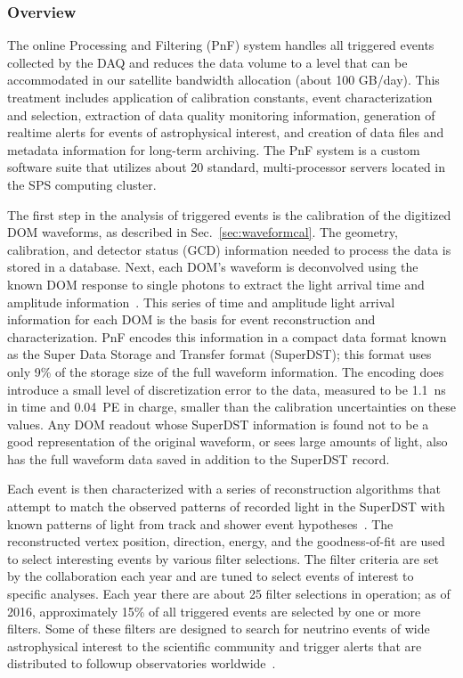\subsubsection{Overview}

The online Processing and Filtering (PnF) system handles
all triggered events collected by the DAQ
and reduces the data volume to a level that can be accommodated in our
satellite bandwidth allocation (about 100 GB/day).  This treatment
includes application of calibration constants, event
characterization and selection, extraction of data quality monitoring
information, generation of realtime alerts for events of astrophysical
interest, and creation of data files and metadata information for long-term
archiving.  The PnF system is a custom software
suite that utilizes about 20 standard, multi-processor servers located in
the SPS computing cluster.  

The first step in the analysis of triggered events is the calibration of
the digitized DOM waveforms, as described in Sec.~\ref{sec:waveformcal}.
The geometry, calibration, and detector status (GCD) information needed to
process the data is stored in a database.  Next, each DOM's waveform is
deconvolved using the known DOM response to single photons to 
extract the light arrival time and amplitude information~\cite{IC3:ereco}.
This series of time and amplitude light arrival information for each DOM is
the basis for event reconstruction and characterization.  PnF encodes this
information in a compact data format known as the Super Data
Storage and Transfer format (SuperDST); this format uses only 9\% of the storage
size of the full waveform information.  The encoding does introduce a
small level of discretization error to the data, measured to be 1.1~ns in time and
0.04~PE in charge, smaller than the calibration uncertainties on these
values.  Any DOM readout whose SuperDST information is found not to be a
good representation of the original waveform, or sees large amounts of
light, also has the full waveform data saved in addition to the
SuperDST record.


Each event is then characterized with a series of reconstruction
algorithms that attempt to match the observed patterns of recorded light in
the SuperDST with known patterns of light from track and shower event
hypotheses~\cite{IC3:ereco}.  The reconstructed vertex position, direction,
energy, and the goodness-of-fit are used to select interesting events by various
filter selections.  The filter criteria are set by the collaboration
each year and are tuned to select events of interest to specific
analyses.  Each year there are about 25 filter selections in
operation; as of 2016, approximately 15\% of all triggered events are
selected by one or more filters.  Some of these filters are designed to search for
neutrino events of wide astrophysical interest to the scientific community
and trigger alerts that are distributed to followup observatories
worldwide~\cite{Abbasi:2011ja,Aartsen:2015trq}.

